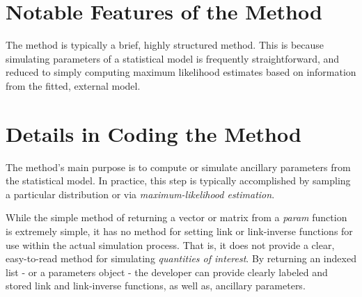\documentclass{article}
\begin{document}

\section{Notable Features of the  Method}

The  method is typically a brief, highly structured method. This is because simulating parameters of a statistical model is frequently straightforward, and reduced to simply computing maximum likelihood estimates based on information from the fitted, external model.


\section{Details in Coding the  Method}

The  method's main purpose is to compute or simulate ancillary parameters from the statistical model.  In practice, this step is typically accomplished by sampling a particular distribution or via \emph{maximum-likelihood estimation}.

While the simple method of returning a vector or matrix from a \emph{param} function is extremely simple, it has no method for setting link or link-inverse functions for use within the actual simulation process.  That is, it does not provide a clear, easy-to-read method for simulating \emph{quantities of interest}.  By returning an indexed list - or a parameters object - the developer can provide clearly labeled and stored link and link-inverse functions, as well as, ancillary parameters.
\end{document}
